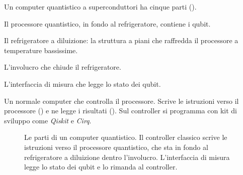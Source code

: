 Un computer quantistico a superconduttori ha cinque parti ().
\begin{description}[leftmargin=0pt, style=unboxed]
  \item[Quantum processor.] Il processore quantistico, in fondo al refrigeratore, contiene i qubit.
  \item[Dilution refrigerator.] Il refrigeratore a diluizione: la struttura a piani che raffredda il processore a
    temperature bassissime.
  \item[Enclosure.] L'involucro che chiude il refrigeratore.
  \item[Measurement interface.] L'interfaccia di misura che legge lo stato dei qubit.
  \item[Classical controller.] Un normale computer che controlla il processore. Scrive le istruzioni verso il
    processore () e ne legge i risultati (). Sul controller si
    programma con kit di sviluppo come \emph{Qiskit} e \emph{Cirq}.
\end{description}

\begin{figure}[ht]
\centering
{}
\caption{Le parti di un computer quantistico. Il controller classico scrive le istruzioni verso il processore
quantistico, che sta in fondo al refrigeratore a diluizione dentro l'involucro. L'interfaccia di misura legge lo stato
dei qubit e lo rimanda al controller.}
\label{fig:qse-hardware}
\end{figure}

